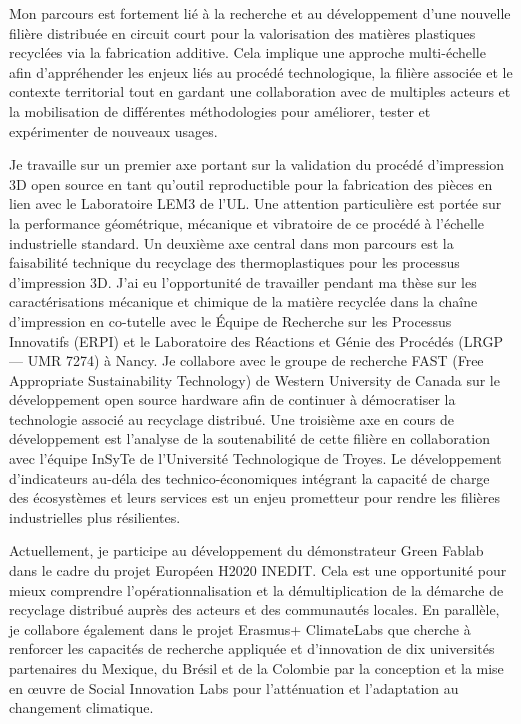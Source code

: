 \documentclass[
  12pt,
  oneside]{book}
\begin{document}
Mon parcours est fortement lié à la recherche et au développement d'une nouvelle filière distribuée en circuit court pour la valorisation des matières plastiques recyclées via la fabrication additive. Cela implique une approche multi-échelle afin d'appréhender les enjeux liés au procédé technologique, la filière associée et le contexte territorial tout en gardant une collaboration avec de multiples acteurs et la mobilisation de différentes méthodologies pour améliorer, tester et expérimenter de nouveaux usages.

Je travaille sur un premier axe portant sur la validation du procédé d'impression 3D open source en tant qu'outil reproductible pour la fabrication des pièces en lien avec le Laboratoire LEM3 de l'UL. Une attention particulière est portée sur la performance géométrique, mécanique et vibratoire de ce procédé à l'échelle industrielle standard.
Un deuxième axe central dans mon parcours est la faisabilité technique du recyclage des thermoplastiques pour les processus d'impression 3D. J'ai eu l'opportunité de travailler pendant ma thèse sur les caractérisations mécanique et chimique de la matière recyclée dans la chaîne d'impression en co-tutelle avec le Équipe de Recherche sur les Processus Innovatifs (ERPI) et le Laboratoire des Réactions et Génie des Procédés (LRGP --- UMR 7274) à Nancy.
Je collabore avec le groupe de recherche FAST (Free Appropriate Sustainability Technology) de Western University de Canada sur le développement open source hardware afin de continuer à démocratiser la technologie associé au recyclage distribué.
Une troisième axe en cours de développement est l'analyse de la soutenabilité de cette filière en collaboration avec l'équipe InSyTe de l'Université Technologique de Troyes.
Le développement d'indicateurs au-déla des technico-économiques intégrant la capacité de charge des écosystèmes et leurs services est un enjeu prometteur pour rendre les filières industrielles plus résilientes.

Actuellement, je participe au développement du démonstrateur Green Fablab dans le cadre du projet Européen H2020 INEDIT.
Cela est une opportunité pour mieux comprendre l'opérationnalisation et la démultiplication de la démarche de recyclage distribué auprès des acteurs et des communautés locales.
En parallèle, je collabore également dans le projet Erasmus+ ClimateLabs que cherche à renforcer les capacités de recherche appliquée et d'innovation de dix universités partenaires du Mexique, du Brésil et de la Colombie par la conception et la mise en œuvre de Social Innovation Labs pour l'atténuation et l'adaptation au changement climatique.
\end{document}
